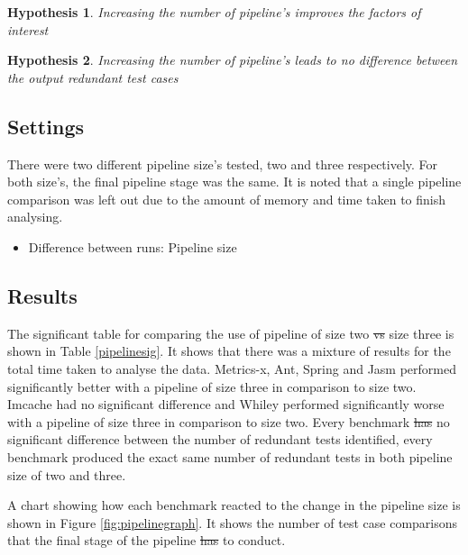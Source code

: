 \documentclass[11pt
              , a4paper
              , twoside
              , openright
              ]{report}
\newtheorem{hyp}{Hypothesis}
\providecommand{\DIFadd}[1]{{\protect\color{blue}\uwave{#1}}} %
\providecommand{\DIFdel}[1]{{\protect\color{red}\sout{#1}}}                      %
\providecommand{\DIFaddbegin}{} %
\providecommand{\DIFaddend}{} %
\providecommand{\DIFdelbegin}{} %
\providecommand{\DIFdelend}{} %
\begin{document}
\begin{hyp}
Increasing the number of pipeline's improves the factors of interest
\end{hyp}

\begin{hyp}
Increasing the number of pipeline's leads to no difference between the output redundant test cases
\end{hyp}

\subsection{Settings}
There were two different pipeline size's tested, two and three respectively. For both size's, the final pipeline stage was the same. It is noted that a single pipeline comparison was left out due to the amount of memory and time taken to finish analysing.

\begin{itemize}
\item Difference between runs: Pipeline size
\end{itemize}

\subsection{Results}

The significant table for comparing the use of pipeline of size two \DIFdelbegin \DIFdel{vs }\DIFdelend \DIFaddbegin \DIFadd{and }\DIFaddend size three is shown in Table \ref{pipelinesig}. It shows that there was a mixture of results for the total time taken to analyse the data. Metrics-x, Ant, Spring and Jasm performed significantly better with a pipeline of size three in comparison to size two. Imcache had no significant difference and Whiley performed significantly worse with a pipeline of size three in comparison to size two. Every benchmark \DIFdelbegin \DIFdel{has }\DIFdelend \DIFaddbegin \DIFadd{had }\DIFaddend no significant difference between the number of redundant tests identified, every benchmark produced the exact same number of redundant tests in both pipeline size of two and three.

A chart showing how each benchmark reacted to the change in the pipeline size is shown in Figure \ref{fig:pipelinegraph}. It shows the number of test case comparisons that the final stage of the pipeline \DIFdelbegin \DIFdel{has }\DIFdelend \DIFaddbegin \DIFadd{had }\DIFaddend to conduct.
\end{document}
